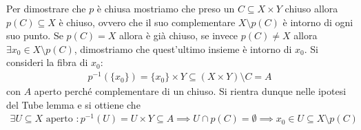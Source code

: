 \begin{demonstration}
	Per dimostrare che $p$ è chiusa mostriamo che preso un $C\subseteq X\times Y$ chiuso allora $p(C)\subseteq X$ è chiuso, ovvero che il suo complementare $X\setminus p(C)$ è intorno di ogni suo punto.\newline
	Se $p(C)=X$ allora è già chiuso, se invece $p(C)\neq X$ allora $\exists x_0\in X\setminus p(C)$, dimostriamo che quest'ultimo insieme è intorno di $x_0$. Si consideri la fibra di $x_0$:
		\begin{gather*}
			p^{-1}(\{x_0\} )=\{x_0\}\times Y \subseteq (X\times Y)\setminus C=A 
		\end{gather*}
	con $A$ aperto perché complementare di un chiuso. \newline
	Si rientra dunque nelle ipotesi del Tube lemma e si ottiene che
		\begin{gather*}
			\exists U\subseteq X \text{ aperto } \colon p^{-1}(U)=U\times Y\subseteq A \implies U\cap p(C)=\emptyset \implies x_0\in U\subseteq X\setminus p(C)
		\end{gather*}
\end{demonstration}